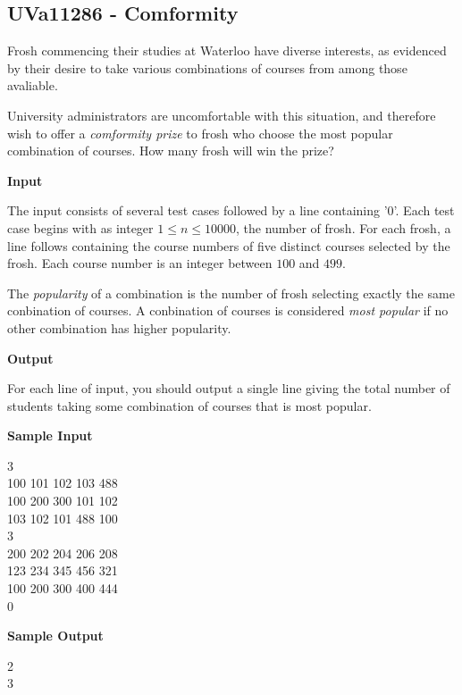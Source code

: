 \subsection{UVa11286 - Comformity}
Frosh commencing their studies at Waterloo have diverse interests, as evidenced by their desire to take various combinations of courses from among those avaliable.

University administrators are uncomfortable with this situation, and therefore wish to offer a \textit{comformity prize} to frosh who choose the most popular combination of courses. How many frosh will win the prize?

\begin{flushleft}
{\color{red} \textbf{Input}}
\end{flushleft}
The input consists of several test cases followed by a line containing '$0$'. Each test case begins with as integer $1 \leq n \leq 10000$, the number of frosh. For each frosh, a line follows containing the course numbers of five distinct courses selected by the frosh. Each course number is an integer between $100$ and $499$.

The \textit{popularity} of a combination is the number of frosh selecting exactly the same conbination of courses. A conbination of courses is considered \textit{most popular} if no other combination has higher popularity.

\begin{flushleft}
{\color{red} \textbf{Output}}
\end{flushleft}
For each line of input, you should output a single line giving the total number of students taking some combination of courses that is most popular.

\begin{flushleft}
{\color{red} \textbf{Sample Input}}
\end{flushleft}
\begin{flushleft}
3\\
100 101 102 103 488\\
100 200 300 101 102\\
103 102 101 488 100\\
3\\
200 202 204 206 208\\
123 234 345 456 321\\
100 200 300 400 444\\
0\\
\end{flushleft}

\begin{flushleft}
{\color{red} \textbf{Sample Output}}
\end{flushleft}
\begin{flushleft}
2\\
3\\
\end{flushleft}

\newpage